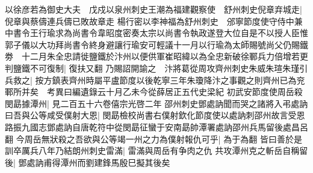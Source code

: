 以徐彦若為御史大夫　戊戍以泉州刺史王潮為福建觀察使　舒州刺史倪章弃城走|{
	倪章與蔡儔連兵儔已敗故章走}
楊行密以李神福為舒州刺史　邠寧節度使守侍中兼中書令王行瑜求為尚書令韋昭度密奏太宗以尚書令執政遂登大位自是不以授人臣惟郭子儀以大功拜尚書令終身避讓行瑜安可輕議十一月以行瑜為太師賜號尚父仍賜鐵劵　十二月朱全忠請徙鹽鐵於汴州以便供軍崔昭緯以為全忠新破徐鄆兵力倍增若更判鹽鐵不可復制|{
	復扶又翻}
乃賜詔開諭之　汴將葛從周攻齊州刺史朱威朱瑄朱瑾引兵救之|{
	按方鎮表齊州時屬平盧節度以後乾寧三年朱瓊降汴之事觀之則齊州已為兖鄆所并矣　考異曰編遺錄云十月乙未今從薛居正五代史梁紀}
初武安節度使周岳殺閔勗據潭州|{
	見二百五十六卷僖宗光啓二年}
邵州刺史鄧處訥聞而哭之諸將入弔處訥曰吾與公等咸受僕射大恩|{
	閔勗檢校尚書右僕射欽化節度使以處訥刺邵州故言受恩路振九國志鄧處訥自唐乾符中從閔勗征蠻于安南勗帥潭署處訥邵州兵馬留後處昌呂翻}
今周岳無狀殺之吾欲與公等竭一州之力為僕射報仇可乎|{
	為于為翻}
皆曰善於是訓卒厲兵八年乃結朗州刺史雷滿|{
	雷滿與周岳有争肉之仇}
共攻潭州克之斬岳自稱留後|{
	鄧處訥甫得潭州而劉建鋒馬殷巳擬其後矣}


